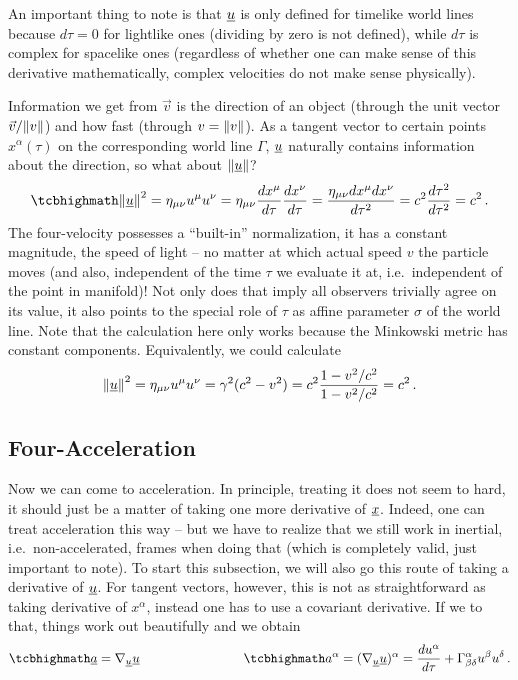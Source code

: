 \documentclass[../relativity_main.tex]{subfiles}
\begin{document}
An important thing to note is that $\underline{u}$ is only defined for timelike world lines because $d\tau = 0$ for lightlike ones (dividing by zero is not defined), while $d\tau$ is complex for spacelike ones (regardless of whether one can make sense of this derivative mathematically, complex velocities do not make sense physically).



Information we get from $\vec{v}$ is the direction of an object (through the unit vector $\vec{v} / \norm{v}$) and how fast (through $v = \norm{v}$). As a tangent vector to certain points $x^\alpha(\tau)$ on the corresponding world line $\Gamma$, $\underline{u}$ naturally contains information about the direction, so what about $\norm{\underline{u}}$?
\begin{equation}
	\eqbox{
	\norm{\fvec{u}}^2 = \eta_{\mu \nu} u^\mu u^\nu = \eta_{\mu \nu} \dv{x^\mu}{\tau} \dv{x^\nu}{\tau} = \frac{\eta_{\mu \nu} dx^\mu dx^\nu}{d\tau^2} = c^2 \frac{d\tau^2}{d\tau^2} = c^2
	} \, .
\end{equation}
The four-velocity possesses a \enquote{built-in} normalization, it has a constant magnitude, the speed of light -- no matter at which actual speed $v$ the particle moves (and also, independent of the time $\tau$ we evaluate it at, i.e.~independent of the point in manifold)! Not only does that imply all observers trivially agree on its value, it also points to the special role of $\tau$ as affine parameter $\sigma$ of the world line. Note that the calculation here only works because the Minkowski metric has constant components. Equivalently, we could calculate
\begin{equation*}
	\norm{\underline{u}}^2 = \eta_{\mu \nu} u^\mu u^\nu = \gamma^2 (c^2 - v^2) = c^2 \frac{1 - v^2 / c^2}{1 - v^2 / c^2} = c^2 \, .
\end{equation*}



		\subsection{Four-Acceleration}\label{subsec:four_acc}
Now we can come to acceleration. In principle, treating it does not seem to hard, it should just be a matter of taking one more derivative of $\underline{x}$. Indeed, one can treat acceleration this way -- but we have to realize that we still work in inertial, i.e.~non-accelerated, frames when doing that (which is completely valid, just important to note). To start this subsection, we will also go this route of taking a derivative of $\underline{u}$. For tangent vectors, however, this is not as straightforward as taking derivative of $x^\alpha$, instead one has to use a covariant derivative. If we to that, things work out beautifully and we obtain
\begin{equation}\label{eq:four_acceleration}
	\eqbox{
	\fvec{a} = \nabla_{\fvec{u}} \fvec{u}
	}
	\manyqquad
	\eqbox{
	a^\alpha = (\nabla_{\fvec{u}} \fvec{u})^\alpha = \dv{u^\alpha}{\tau} + \Gamma^\alpha_{\beta \delta} u^\beta u^\delta
	} \, .
\end{equation}
\end{document}
